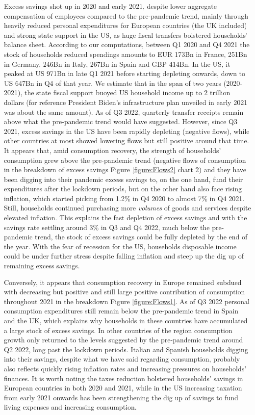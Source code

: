 Excess savings shot up in 2020 and early 2021, despite lower aggregate compensation of employees compared to the pre-pandemic trend, mainly through heavily reduced personal expenditures for European countries (the UK included) and strong state support in the US, as huge fiscal transfers bolstered households’ balance sheet. 
According to our computations, between Q1 2020 and Q4 2021 the stock of households reduced spendings amounts to EUR 173Bn in France, 251Bn in Germany, 246Bn in Italy, 267Bn in Spain and GBP 414Bn. 
In the US, it peaked at US 971Bn in late Q1 2021 before starting depleting onwards, down to US 647Bn in Q4 of that year.
We estimate that in the span of two years (2020-2021), the state fiscal support buoyed US household income up to 2 trillion dollars (for reference President Biden's infrastructure plan unveiled in early 2021 was about the same amount). 
As of Q3 2022, quarterly transfer receipts remain above what the pre-pandemic trend would have suggested. 
However, since Q3 2021, excess savings in the US have been rapidly depleting (negative flows), while other countries at most showed lowering flows but still positive around that time. 
It appears that, amid consumption recovery, the strength of households’ consumption grew above the pre-pandemic trend (negative flows of consumption in the breakdown of excess savings Figure \ref{figure:Flows2} chart 2) and they have been digging into their pandemic excess savings to, on the one hand, fund their expenditures after the lockdown periods, but on the other hand also face rising inflation, which started picking from 1.2\% in Q4 2020 to almost 7\% in Q4 2021. 
Still, households continued purchasing more \textit{volumes} of goods and services despite elevated inflation. 
This explains the fast depletion of excess savings and with the savings rate settling around 3\% in Q3 and Q4 2022, much below the pre-pandemic trend, the stock of excess savings could be fully depleted by the end of the year. 
With the fear of recession for the US, households disposable income could be under further stress despite falling inflation and steep up the dig up of remaining excess savings.

Conversely, it appears that consumption recovery in Europe remained subdued with decreasing but positive and still large positive contribution of consumption throughout 2021 in the breakdown Figure \ref{figure:Flows1}.
As of Q3 2022 personal consumption expenditures still remain below the pre-pandemic trend in Spain and the UK, which explains why households in these countries have accumulated a large stock of excess savings. 
In other countries of the region consumption growth only returned to the levels suggested by the pre-pandemic trend around Q2 2022, long past the lockdown periods. 
Italian and Spanish households digging into their savings, despite what we have said regarding consumption, probably also reflects quickly rising inflation rates and increasing pressures on households’ finances. 
It is worth noting the taxes reduction bolstered households’ savings in European countries in both 2020 and 2021, while in the US increasing taxation from early 2021 onwards has been strengthening the dig up of savings to fund living expenses and increasing consumption.

